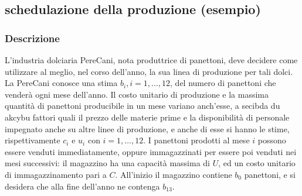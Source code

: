 \documentclass[12pt,a4paper]{article}
\begin{document}
\subsection{schedulazione della produzione (esempio)}
\subsubsection{Descrizione}
L'industria dolciaria PereCani, nota produttrice di panettoni, deve decidere come utilizzare al meglio, 
nel corso dell'anno, la sua linea di produzione per tali dolci. La PereCani conosce una stima $b_i,i = 1,\ldots,12$, del numero di panettoni che venderà ogni mese dell'anno.
Il costo unitario di produzione e la massima quantità di panettoni producibile in un mese variano anch'esse, a secibda du akcybu fattori quali il prezzo delle materie prime e la disponibilità
di personale impegnato anche su altre linee di produzione, e anche di esse si hanno le stime, rispettivamente $c_i$ e $u_i$ con $i = 1,\ldots,12$. I panettoni prodotti al mese $i$ possono essere venduti immediatamente,
oppure immagazzinati per essere poi venduti nei mesi successivi: il magazzino ha una capacità massima di $U$, ed un costo unitario di immagazzinamento pari a $C$. All'inizio il magazzino contiene $b_0$ panettoni, e si desidera che alla fine dell'anno ne contenga $b_13$.
\end{document}
